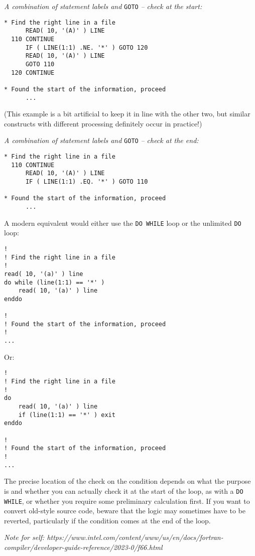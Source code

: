 \vspace{\baselineskip}
\noindent \emph{A combination of statement labels and} \verb+GOTO+ \emph{-- check at the start:}
\begin{verbatim}
* Find the right line in a file
      READ( 10, '(A)' ) LINE
  110 CONTINUE
      IF ( LINE(1:1) .NE. '*' ) GOTO 120
      READ( 10, '(A)' ) LINE
      GOTO 110
  120 CONTINUE

* Found the start of the information, proceed
      ...
\end{verbatim}
\noindent (This example is a bit artificial to keep it in line with the other two,
but similar constructs with different processing definitely occur in practice!)

\vspace{\baselineskip}
\noindent \emph{A combination of statement labels and} \verb+GOTO+ \emph{-- check at the end:}
\begin{verbatim}
* Find the right line in a file
  110 CONTINUE
      READ( 10, '(A)' ) LINE
      IF ( LINE(1:1) .EQ. '*' ) GOTO 110

* Found the start of the information, proceed
      ...
\end{verbatim}

A modern equivalent would either use the \verb+DO WHILE+ loop or the unlimited
\verb+DO+ loop:
%
\begin{verbatim}
!
! Find the right line in a file
!
read( 10, '(a)' ) line
do while (line(1:1) == '*' )
    read( 10, '(a)' ) line
enddo

!
! Found the start of the information, proceed
!
...
\end{verbatim}
%
Or:
%
\begin{verbatim}
!
! Find the right line in a file
!
do
    read( 10, '(a)' ) line
    if (line(1:1) == '*' ) exit
enddo

!
! Found the start of the information, proceed
!
...
\end{verbatim}

The precise location of the check on the condition depends on what the purpose is and
whether you can actually check it at the start of the loop, as with a \verb+DO WHILE+,
or whether you require some preliminary calculation first. If you want to convert
old-style source code, beware that the logic may sometimes have to be reverted,
particularly if the condition comes at the end of the loop.

\emph{Note for self: https://www.intel.com/content/www/us/en/docs/fortran-compiler/developer-guide-reference/2023-0/f66.html}


